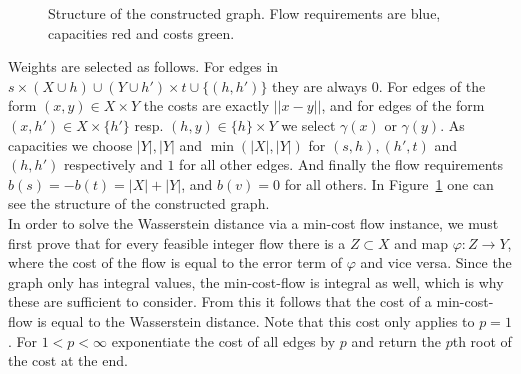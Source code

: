 \documentclass[11pt, a4paper, UKenglish]{article}
\begin{document}
\begin{figure}
\begin{tikzpicture}[scale = .95]
        \end{tikzpicture}
        \caption{Structure of the constructed graph.
        Flow requirements are blue, capacities red and costs green.}
        \label{graph}
    \end{figure}

    Weights are selected as follows.
    For edges in ${s}\times (X\cup h) \cup (Y\cup h')\times t \cup \{(h,h')\}$ they are always 0.
    For edges of the form $(x,y)\in X\times Y$ the costs are exactly $||x-y||$, and for edges of the form $(x,h')\in X\times \{h'\}$ resp. $(h,y)\in \{h\}\times Y$ we select $\gamma(x)$ or $\gamma(y)$.
    As capacities we choose $|Y|,|Y|$ and $\min(|X|,|Y|)$ for $(s,h),(h',t)$ and $(h,h')$ respectively and $1$ for all other edges.
    And finally the flow requirements $b(s) = -b(t) = |X|+|Y|$, and $b(v)=0$ for all others.
    In Figure\ \ref{graph} one can see the structure of the constructed graph.\\
    In order to solve the Wasserstein distance via a min-cost flow instance, we must first prove that for every feasible integer flow there is a $Z\subset X$ and map $\varphi:Z\rightarrow Y$, where the cost of the flow is equal to the error term of $\varphi$ and vice versa.
    Since the graph only has integral values, the min-cost-flow is integral as well, which is why these are sufficient to consider.
    From this it follows that the cost of a min-cost-flow is equal to the Wasserstein distance.
    Note that this cost only applies to $p=1$.
    For $1<p<\infty$ exponentiate the cost of all edges by $p$ and return the $p$th root of the cost at the end.
\end{document}
